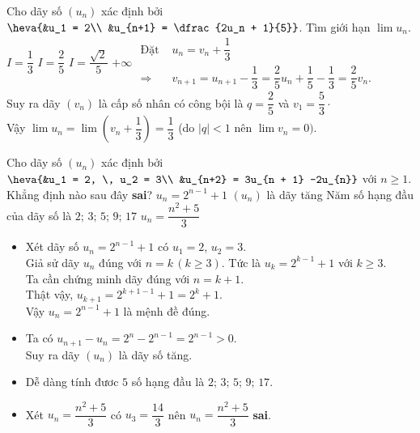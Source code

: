 \begin{ex}%
	Cho dãy số $ \left(u_n\right) $ xác định bởi  $\heva{&u_1 = 2\\ &u_{n+1} = \dfrac{2u_n + 1}{5}} $. Tìm giới hạn $ \lim u_n. $
	\choice
	{\True  $ I= \dfrac{1}{3} $}
	{ $ I = \dfrac{2}{5} $}
	{ $ I  = \dfrac{\sqrt{2}}{5} $}
	{ $ +\infty $}	
	\loigiai
	{$\begin{aligned}
		\text{Đặt } &u_n = v_n + \dfrac{1}{3} \\
		\Rightarrow &v_{n+1} = u_{n+1} - \dfrac{1}{3} = \dfrac{2}{5} u_n + \dfrac{1}{5} - \dfrac{1}{3} = \dfrac{2}{5} v_n.
		\end{aligned}$\\
		Suy ra dãy $ \left(v_n\right) $ là cấp số nhân có công bội là $ q = \dfrac{2}{5} $ và $ v_1 = \dfrac{5}{3} \cdot $\\
		Vậy $ \lim u_n = \lim \left(v_n + \dfrac{1}{3}\right) = \dfrac{1}{3}$ (do $ \left|q \right| < 1  $ nên $ \lim v_n = 0). $
	}
\end{ex}

\begin{ex}%
	Cho dãy số $ \left(u_n\right) $ xác định bởi  $\heva{&u_1 = 2, \, u_2 = 3\\ &u_{n+2} = 3u_{n + 1} -2u_{n}}  $ với $ n \ge 1 $. Khẳng định nào sau đây \textbf{sai}?	
	\choice
	{$ u_n = 2^{n-1} + 1 $ }
	{$ \left(u_n\right) $ là dãy tăng}
	{Năm số hạng đầu của dãy số là $2; \, 3; \,  5; \, 9; \, 17$ }
	{\True $ u_n = \dfrac{n^2+5}{3} $ }	
	\loigiai
	{\begin{itemize}
			\item Xét dãy số $ u_n = 2^{n-1} + 1 $ có $ u_1 = 2 $, $ u_2 = 3 $. \\Giả sử dãy $ u_n $ đúng với $ n = k \, (k \ge 3)$. Tức là $ u_k = 2^{k-1} + 1 $ với $ k \ge 3 $. \\Ta cần chứng minh dãy đúng với $ n = k+1 $. \\
			Thật vậy, $ u_{k+1} = 2^{k+1-1} + 1   = 2^k + 1$.\\
			Vậy $ u_n = 2^{n-1} + 1 $ là mệnh đề đúng.
			\item Ta có $ u_{n+1} - u_n = 2^n - 2^{n-1} = 2^{n-1} > 0 $.\\
			Suy ra dãy $ \left(u_n\right) $ là dãy số tăng.
			\item Dễ dàng tính đươc $ 5 $ số hạng đầu là $2; \, 3; \,  5; \, 9; \, 17$. 
			\item Xét $ u_n = \dfrac{n^2+5}{3} $ có $ u_3 = \dfrac{14}{3} $ nên  $ u_n = \dfrac{n^2+5}{3} $  \textbf{sai}.
		\end{itemize}
		
	}
\end{ex}

